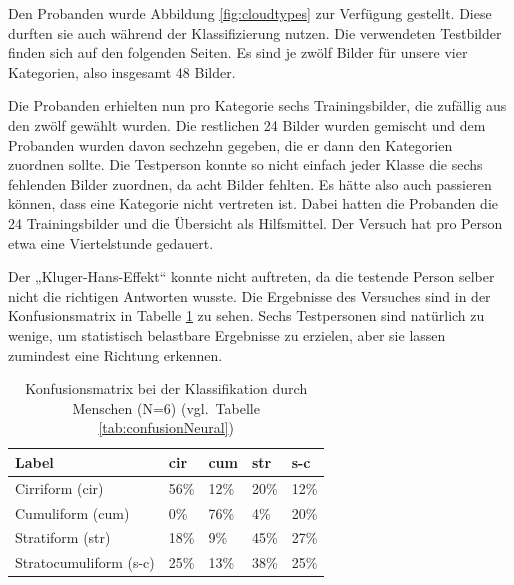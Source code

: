 \documentclass[a4,german]{article}
\begin{document}
Den Probanden wurde Abbildung \ref{fig:cloudtypes} zur Verfügung gestellt.
Diese durften sie auch während der Klassifizierung nutzen.
Die verwendeten Testbilder finden sich auf den folgenden Seiten.
Es sind je zwölf Bilder für unsere vier Kategorien, also insgesamt 48 Bilder.

Die Probanden erhielten nun pro Kategorie sechs Trainingsbilder, die zufällig aus den zwölf gewählt wurden.
Die restlichen 24 Bilder wurden gemischt und dem Probanden wurden davon sechzehn gegeben, die er dann den Kategorien zuordnen sollte.
Die Testperson konnte so nicht einfach jeder Klasse die sechs fehlenden Bilder zuordnen, da acht Bilder fehlten.
Es hätte also auch passieren können, dass eine Kategorie nicht vertreten ist.
Dabei hatten die Probanden die 24 Trainingsbilder und die Übersicht als Hilfsmittel.
Der Versuch hat pro Person etwa eine Viertelstunde gedauert.

Der „Kluger-Hans-Effekt“ konnte nicht auftreten, da die testende Person selber nicht die richtigen Antworten wusste.
Die Ergebnisse des Versuches sind in der Konfusionsmatrix in Tabelle \ref{tab:humanConfusion} zu sehen.
Sechs Testpersonen sind natürlich zu wenige, um statistisch belastbare Ergebnisse zu erzielen, aber sie lassen zumindest eine Richtung erkennen.

\begin{table}[h!]
    \centering
    \begin{tabular}{| l | l | l | l | l |}
        \hline
        Label & cir & cum & str & s-c \\ \hline
        Cirriform (cir) & 56\% & 12\% & 20\% & 12\% \\ \hline
        Cumuliform (cum) & 0\% & 76\% & 4\% & 20\% \\ \hline
        Stratiform (str) & 18\% & 9\% & 45\% & 27\% \\ \hline
        Stratocumuliform (s-c) & 25\% & 13\% & 38\% & 25\% \\ \hline
    \end{tabular}
    \caption{Konfusionsmatrix bei der Klassifikation durch Menschen (N=6) (vgl.\ Tabelle \ref{tab:confusionNeural})}
    \label{tab:humanConfusion}
\end{table}


\end{document}
